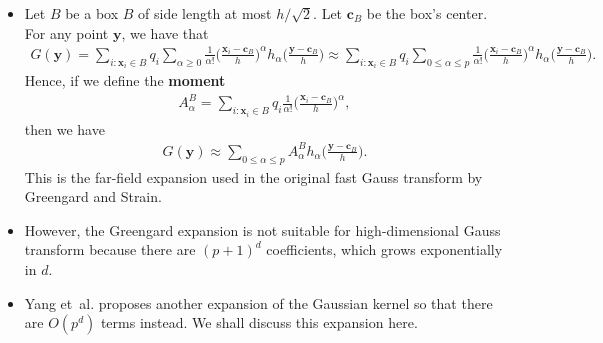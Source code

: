 \documentclass[10pt]{article}
\newcommand{\ve}[1]{\mathbf{#1}}
\newcommand{\etal}{{et~al.}}
\begin{document}
\begin{itemize}
  \item Let $B$ be a box $B$ of side length at most $h / \sqrt{2}$. Let $\ve{c}_B$ be the box's center. For any point $\ve{y}$, we have that
  \begin{align*}
    G(\ve{y}) = \sum_{i: \ve{x}_i \in B} q_i \sum_{\alpha \geq 0} \frac{1}{\alpha!} \bigg( \frac{\ve{x}_i - \ve{c}_B}{h} \bigg)^\alpha h_\alpha \bigg( \frac{\ve{y} - \ve{c}_B}{h} \bigg)
    \approx \sum_{i: \ve{x}_i \in B} q_i \sum_{0 \leq \alpha \leq p} \frac{1}{\alpha!} \bigg( \frac{\ve{x}_i - \ve{c}_B}{h} \bigg)^\alpha h_\alpha \bigg( \frac{\ve{y} - \ve{c}_B}{h} \bigg).
  \end{align*}
  Hence, if we define the {\bf moment}
  \begin{align*}
    A_\alpha^B = \sum_{i : \ve{x}_i \in B} q_i \frac{1}{\alpha!} \bigg( \frac{\ve{x}_i - \ve{c}_B}{h} \bigg)^\alpha,
  \end{align*}
  then we have
  \begin{align*}
    G(\ve{y}) \approx \sum_{0 \leq \alpha \leq p} A_\alpha^B h_\alpha \bigg( \frac{\ve{y} - \ve{c}_B}{h} \bigg).
  \end{align*}
  This is the far-field expansion used in the original fast Gauss transform by Greengard and Strain.
  
  \item However, the Greengard expansion is not suitable for high-dimensional Gauss transform because there are $(p+1)^d$ coefficients, which grows exponentially in $d$. 
  
  \item Yang \etal \cite{yang} proposes another expansion of the Gaussian kernel so that there are $O(p^d)$ terms instead. We shall discuss this expansion here.
  

\end{itemize}
\end{document}
